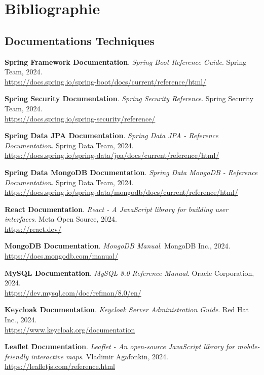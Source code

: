 \chapter*{Bibliographie}

\section*{Documentations Techniques}

\noindent [1] \textbf{Spring Framework Documentation}. \textit{Spring Boot Reference Guide}. Spring Team, 2024. \\
\url{https://docs.spring.io/spring-boot/docs/current/reference/html/}

\noindent [2] \textbf{Spring Security Documentation}. \textit{Spring Security Reference}. Spring Security Team, 2024. \\
\url{https://docs.spring.io/spring-security/reference/}

\noindent [3] \textbf{Spring Data JPA Documentation}. \textit{Spring Data JPA - Reference Documentation}. Spring Data Team, 2024. \\
\url{https://docs.spring.io/spring-data/jpa/docs/current/reference/html/}

\noindent [4] \textbf{Spring Data MongoDB Documentation}. \textit{Spring Data MongoDB - Reference Documentation}. Spring Data Team, 2024. \\
\url{https://docs.spring.io/spring-data/mongodb/docs/current/reference/html/}

\noindent [5] \textbf{React Documentation}. \textit{React - A JavaScript library for building user interfaces}. Meta Open Source, 2024. \\
\url{https://react.dev/}

\noindent [6] \textbf{MongoDB Documentation}. \textit{MongoDB Manual}. MongoDB Inc., 2024. \\
\url{https://docs.mongodb.com/manual/}

\noindent [7] \textbf{MySQL Documentation}. \textit{MySQL 8.0 Reference Manual}. Oracle Corporation, 2024. \\
\url{https://dev.mysql.com/doc/refman/8.0/en/}

\noindent [8] \textbf{Keycloak Documentation}. \textit{Keycloak Server Administration Guide}. Red Hat Inc., 2024. \\
\url{https://www.keycloak.org/documentation}

\noindent [9] \textbf{Leaflet Documentation}. \textit{Leaflet - An open-source JavaScript library for mobile-friendly interactive maps}. Vladimir Agafonkin, 2024. \\
\url{https://leafletjs.com/reference.html}

